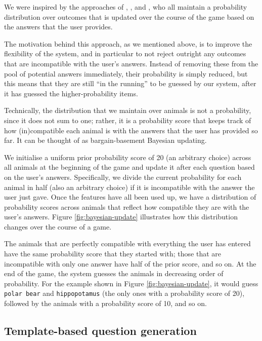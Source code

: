 \documentclass[11pt,a4paper]{article}
\begin{document}
We were inspired by the approaches of \citet{DeyEa2019}, \citet{HuEa2018}, and \citet{Burgener2006}, who all maintain a probability distribution over outcomes that is updated over the course of the game based on the answers that the user provides.

The motivation behind this approach, as we mentioned above, is to improve the flexibility of the system, and in particular to not reject outright any outcomes that are incompatible with the user's \mbox{answers}.
Instead of removing these from the pool of potential answers immediately, their probability is simply reduced, but this means that they are still ``in the running'' to be guessed by our system, after it has guessed the higher-probability items.

Technically, the distribution that we maintain over animals is not a probability, since it does not sum to one; rather, it is a probability score that keeps track of how (in)compatible each animal is with the answers that the user has provided so far.
It can be thought of as bargain-basement Bayesian updating.

We initialise a uniform prior probability score of 20 (an arbitrary choice) across all animals at the beginning of the game and update it after each question based on the user's answers.
Specifically, we divide the current probability for each animal in half (also an arbitrary choice) if it is incompatible with the answer the user just gave.
Once the features have all been used up, we have a distribution of probability scores across animals that reflect how compatible they are with the user's answers.
Figure \ref{fig:bayesian-update} illustrates how this distribution changes over the course of a game.

The animals that are perfectly compatible with everything the user has entered have the same probability score that they started with; those that are incompatible with only one answer have half of the prior score, and so on.
At the end of the game, the system guesses the animals in decreasing order of probability.
For the example shown in Figure \ref{fig:bayesian-update}, it would guess \texttt{polar bear} and \texttt{hippopotamus} (the only ones with a probability score of 20), followed by the animals with a probability score of 10, and so on.

\subsection{Template-based question generation}
\label{subsec:qg}
\end{document}
